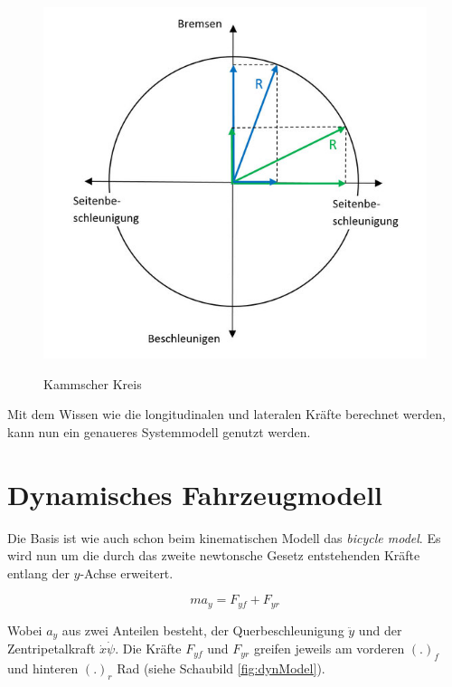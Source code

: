 \documentclass{like}
\begin{document}
\begin{figure}[ht!]
	\caption{Kammscher Kreis}
	\includegraphics[width=400pt]{Abbildungen/kamKreis.jpg}
	\label{fig:kamKreis}
\end{figure}
	
	



Mit dem Wissen wie die longitudinalen und lateralen Kräfte berechnet werden, kann nun ein genaueres Systemmodell genutzt werden.

\section{Dynamisches Fahrzeugmodell}
\label{dynModel}

Die Basis ist wie auch schon beim kinematischen Modell das \textit{bicycle model}. Es wird nun um die durch das zweite newtonsche Gesetz entstehenden Kräfte entlang der \(y\)-Achse erweitert.

\begin{equation}
ma_y = F_{yf} + F_{yr}
\end{equation}   


Wobei \(a_y\) aus zwei Anteilen besteht, der Querbeschleunigung \(\ddot{y}\) und der Zentripetalkraft \(\dot{x} \dot{\psi}\).  
Die Kräfte \(F_{yf}\) und \(F_{yr}\) greifen jeweils am vorderen \((.)_f\) und hinteren \((.)_r\) Rad (siehe Schaubild \ref{fig:dynModel}). 
\end{document}
